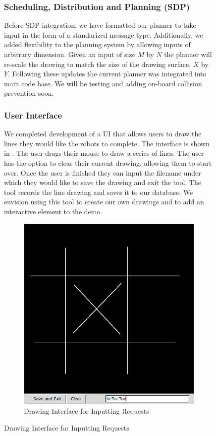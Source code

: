 \begin{figure}[h!]
\subsubsection{Scheduling, Distribution and Planning (SDP)}
Before SDP integration, we have formatted our planner to take input in the form of a standarized message type. Additionally, we added flexibility to the planning system by allowing inputs of arbitrary dimension. Given an input of size $M$ by $N$ the planner will re-scale the drawing to match the size of the drawing surface, $X$ by $Y$. Following these updates the current planner was integrated into main code base. We will be testing and adding on-board collision prevention soon.  

\subsubsection{User Interface}
We completed development of a UI that allows users to draw the lines they would like the robots to complete. The interface is shown in . The user drags their mouse to draw a series of lines. The user has the option to clear their current drawing, allowing them to start over. Once the user is finished they can input the filename under which they would like to save the drawing and exit the tool. The tool records the line drawing and saves it to our database. We envision using this tool to create our own drawings and to add an interactive element to the demo.   

\begin{figure}[h!]
\centering
\includegraphics[width=0.49\columnwidth]{figs/drawingInterface.png}
\caption{Drawing Interface for Inputting Requests}
\label{fig:drawing_interface}
\end{figure}


\end{figure}
